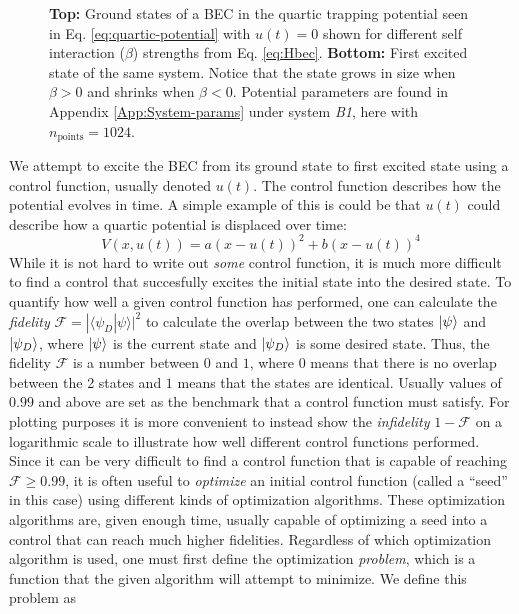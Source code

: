 \documentclass[a4paper, twocolumn]{revtex4-1}
\begin{document}
\begin{figure}[h]
\begin{subfigure}{\columnwidth}
	\end{subfigure}
	\caption{\textbf{Top:} Ground states of a BEC in the quartic trapping potential seen in Eq. \eqref{eq:quartic-potential} with $u(t)=0$ shown for different self interaction ($\beta$) strengths from Eq. \eqref{eq:Hbec}. \textbf{Bottom:} First excited state of the same system. Notice that the state grows in size when $\beta > 0$ and shrinks when $\beta < 0$. Potential parameters are found in Appendix \ref{App:System-params} under system \textit{B1}, here with $n_{\text{points}}=1024$.}
	\label{fig:BECstates}
\end{figure}

We attempt to excite the BEC from its ground state to first excited state using a control function, usually denoted $u(t)$. The control function describes how the potential evolves in time. A simple example of this is could be that $u(t)$ could describe how a quartic potential is displaced over time:
\begin{equation}
	V(x, u(t)) = a(x-u(t))^2 + b(x-u(t))^4
	\label{eq:quartic-potential}
\end{equation}
While it is not hard to write out \textit{some} control function, it is much more difficult to find a control that succesfully excites the initial state into the desired state. To quantify how well a given control function has performed, one can calculate the \textit{fidelity} $\mathcal{F} = | \langle \psi_D | \psi \rangle |^2$ to calculate the overlap between the two states $\ket{\psi}$ and $\ket{\psi_D}$, where $\ket{\psi}$ is the current state and $\ket{\psi_D}$ is some desired state. Thus, the fidelity $\mathcal{F}$ is a number between $0$ and $1$, where $0$ means that there is no overlap between the 2 states and $1$ means that the states are identical. Usually values of $0.99$ and above are set as the benchmark that a control function must satisfy. For plotting purposes it is more convenient to instead show the \textit{infidelity} $1-\mathcal{F}$ on a logarithmic scale to illustrate how well different control functions performed.\\

Since it can be very difficult to find a control function that is capable of reaching $\mathcal{F} \geq 0.99$, it is often useful to \textit{optimize} an initial control function (called a ``seed'' in this case) using different kinds of optimization algorithms. These optimization algorithms are, given enough time, usually capable of optimizing a seed into a control that can reach much higher fidelities. Regardless of which optimization algorithm is used, one must first define the optimization \textit{problem}, which is a function that the given algorithm will attempt to minimize. We define this problem as \cite{JensJacobPhDThesis} 
\end{document}
